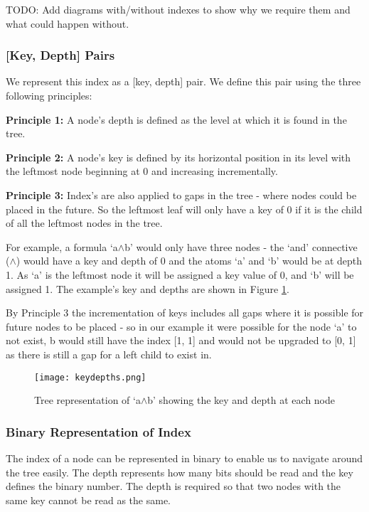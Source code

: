 \documentclass{report}
\begin{document}
TODO: Add diagrams with/without indexes to show why we require them and what could happen without.

\subsubsection{[Key, Depth] Pairs}

We represent this index as a [key, depth] pair. We define this pair using the three following principles:

\textbf{Principle 1:} A node's depth is defined as the level at which it is found in the tree. 

\textbf{Principle 2:} A node's key is defined by its horizontal position in its level with the leftmost node beginning at 0 and increasing incrementally.

\textbf{Principle 3:} Index's are also applied to gaps in the tree - where nodes could be placed in the future. So the leftmost leaf will only have a key of 0 if it is the child of all the leftmost nodes in the tree.

For example, a formula `a$\land$b' would only have three nodes - the `and' connective ($\land$) would have a key and depth of 0 and the atoms `a' and `b' would be at depth 1. As `a' is the leftmost node it will be assigned a key value of 0, and `b' will be assigned 1. The example's key and depths are shown in Figure \ref{keydepths}. 

By Principle 3 the incrementation of keys includes all gaps where it is possible for future nodes to be placed - so in our example it were possible for the node `a' to not exist, b would still have the index [1, 1] and would not be upgraded to [0, 1] as there is still a gap for a left child to exist in.

\begin{figure}[ht]
    \centering
    \texttt{[image: keydepths.png]}
    \caption{Tree representation of `a$\land$b' showing the key and depth at each node}
    \label{keydepths}
\end{figure}

\subsubsection{Binary Representation of Index}

The index of a node can be represented in binary to enable us to navigate around the tree easily. The depth represents how many bits should be read and the key defines the binary number. The depth is required so that two nodes with the same key cannot be read as the same. 
\end{document}
